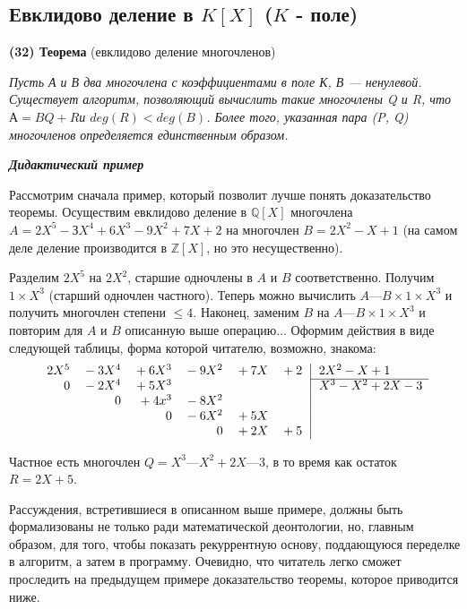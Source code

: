 \documentclass{mai_book}
\begin{document}
\subsection{Евклидово деление в $K[X]$ ($K$ - поле)}

\noindent\textbf{(32) Теорема} (евклидово деление многочленов)

\textit{Пусть А и В два многочлена с коэффициентами в поле К, В —  
ненулевой. Существует алгоритм, позволяющий вычислить такие  
многочлены Q и R, что $А = BQ + R $и $deg(R) < deg(B)$. Более того, указанная 
пара (P, Q) многочленов определяется единственным образом.}\newline

\noindent\textbf{\textit{Дидактический пример}}

Рассмотрим сначала пример, который позволит лучше понять  
доказательство теоремы. Осуществим евклидово деление в $\mathbb{Q}[X]$ многочлена 
$A = 2X^5 - ЗX^4 + 6X^3 - 9X^2 + 7X + 2$ на многочлен $B = 2X^2 - X + 1$ 
(на самом деле деление производится в $\mathbb{Z}[X]$, но это несущественно). 

Разделим $2X^5$ на $2X^2$, старшие одночлены в $A$ и $B$ соответственно. 
Получим $1 \times X^3$ (старший одночлен частного). Теперь можно вычислить 
$A — B \times 1 \times X^3$ и получить многочлен степени $\leq 4$. Наконец, заменим $B$ 
на $A — B \times 1 \times X^3$ и повторим для $A$ и $B$ описанную выше операцию... 
Оформим действия в виде следующей таблицы, форма которой  
читателю, возможно, знакома: 
$$
\begin{array}{rrrrrr@{\,}r|l}
2X^5&{}-3X^4&{}+6X^3&{}-9X^2&{}+7X&{}+2&&\,2X^2-X+1\\
\cline{8-8}
0&{}-2X^4&{}+5X^3&&&&&\,X^3-X^2+2X-3\\
&{}0&{}+4x^3&{}-8X^2&&&&\\
&{}&{}0&{}-6X^2&{}+5X&{}&&\\
&{}&{}&{}0&{}+2X&{}+5&{}&\\
\end{array}
$$

Частное есть многочлен $Q = X^3 — X^2 + 2X — 3$, в то время как 
остаток $R = 2X + 5$. 

Рассуждения, встретившиеся в описанном выше примере, должны 
быть формализованы не только ради математической деонтологии, но, 
главным образом, для того, чтобы показать рекуррентную основу,  
поддающуюся переделке в алгоритм, а затем в программу. Очевидно, что 
читатель легко сможет проследить на предыдущем примере  
доказательство теоремы, которое приводится ниже. 
\end{document}
